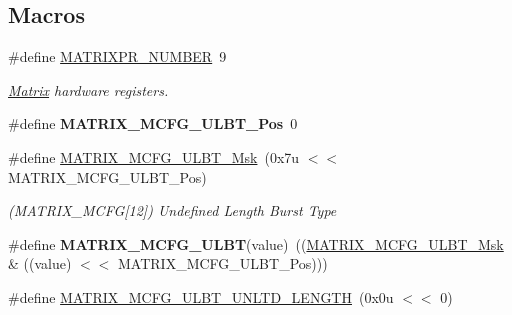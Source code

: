 \subsection*{Macros}
\begin{DoxyCompactItemize}
\item 
\mbox{\label{group__SAMV71__MATRIX_gafdd5910e0fa935742d5f7a0ab3dd8004}} 
\#define \mbox{\hyperlink{group__SAMV71__MATRIX_gafdd5910e0fa935742d5f7a0ab3dd8004}{M\+A\+T\+R\+I\+X\+P\+R\+\_\+\+N\+U\+M\+B\+ER}}~9
\begin{DoxyCompactList}\small\item\em \mbox{\hyperlink{structMatrix}{Matrix}} hardware registers. \end{DoxyCompactList}\item 
\mbox{\label{group__SAMV71__MATRIX_ga1fc1465710ba1290ea389c8601920f6e}} 
\#define {\bfseries M\+A\+T\+R\+I\+X\+\_\+\+M\+C\+F\+G\+\_\+\+U\+L\+B\+T\+\_\+\+Pos}~0
\item 
\mbox{\label{group__SAMV71__MATRIX_ga42a3b77b53cd69fbbfbb50a6ce74e0db}} 
\#define \mbox{\hyperlink{group__SAMV71__MATRIX_ga42a3b77b53cd69fbbfbb50a6ce74e0db}{M\+A\+T\+R\+I\+X\+\_\+\+M\+C\+F\+G\+\_\+\+U\+L\+B\+T\+\_\+\+Msk}}~(0x7u $<$$<$ M\+A\+T\+R\+I\+X\+\_\+\+M\+C\+F\+G\+\_\+\+U\+L\+B\+T\+\_\+\+Pos)
\begin{DoxyCompactList}\small\item\em (M\+A\+T\+R\+I\+X\+\_\+\+M\+C\+FG\mbox{[}12\mbox{]}) Undefined Length Burst Type \end{DoxyCompactList}\item 
\mbox{\label{group__SAMV71__MATRIX_gaf17c5b95655ead50796c253ff084c5e5}} 
\#define {\bfseries M\+A\+T\+R\+I\+X\+\_\+\+M\+C\+F\+G\+\_\+\+U\+L\+BT}(value)~((\mbox{\hyperlink{group__SAMV71__MATRIX_ga42a3b77b53cd69fbbfbb50a6ce74e0db}{M\+A\+T\+R\+I\+X\+\_\+\+M\+C\+F\+G\+\_\+\+U\+L\+B\+T\+\_\+\+Msk}} \& ((value) $<$$<$ M\+A\+T\+R\+I\+X\+\_\+\+M\+C\+F\+G\+\_\+\+U\+L\+B\+T\+\_\+\+Pos)))
\item 
\mbox{\label{group__SAMV71__MATRIX_gae25aaf63ba205ce606a9c38a0a082b14}} 
\#define \mbox{\hyperlink{group__SAMV71__MATRIX_gae25aaf63ba205ce606a9c38a0a082b14}{M\+A\+T\+R\+I\+X\+\_\+\+M\+C\+F\+G\+\_\+\+U\+L\+B\+T\+\_\+\+U\+N\+L\+T\+D\+\_\+\+L\+E\+N\+G\+TH}}~(0x0u $<$$<$ 0)
$$
\end{DoxyCompactItemize}
